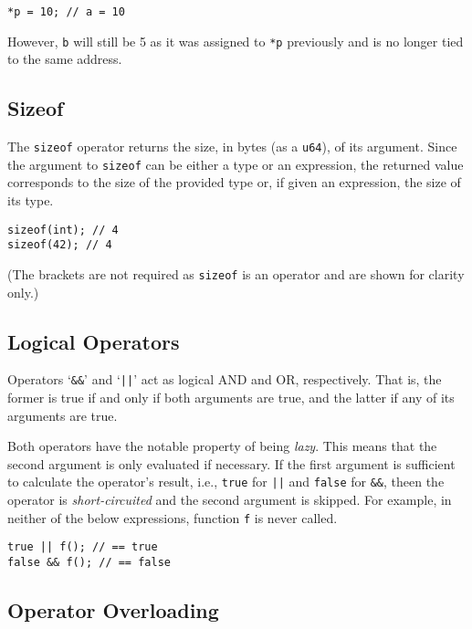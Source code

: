 \begin{lstlisting}[language=CustomLang]
*p = 10; // a = 10
\end{lstlisting}

However, \texttt{b} will still be 5 as it was assigned to \texttt{*p} previously and is no longer tied to the same address.

\subsection{Sizeof}

The \texttt{sizeof} operator returns the size, in bytes (as a \texttt{u64}), of its argument.
Since the argument to \texttt{sizeof} can be either a type or an expression, the returned value corresponds to the size of the provided type or, if given an expression, the size of its type.

\begin{lstlisting}[language=CustomLang]
sizeof(int); // 4
sizeof(42); // 4
\end{lstlisting}

(The brackets are not required as \texttt{sizeof} is an operator and are shown for clarity only.)

\subsection{Logical Operators}

Operators `\texttt{\&\&}' and `\texttt{||}' act as logical AND and OR, respectively.
That is, the former is true if and only if both arguments are true, and the latter if any of its arguments are true.

Both operators have the notable property of being \textit{lazy}.
This means that the second argument is only evaluated if necessary.
If the first argument is sufficient to calculate the operator's result, i.e., \texttt{true} for \texttt{||} and \texttt{false} for \texttt{\&\&}, theen the operator is \textit{short-circuited} and the second argument is skipped.
For example, in neither of the below expressions, function \texttt{f} is never called.

\begin{lstlisting}[language=CustomLang]
true || f(); // == true
false && f(); // == false
\end{lstlisting}

\subsection{Operator Overloading}

